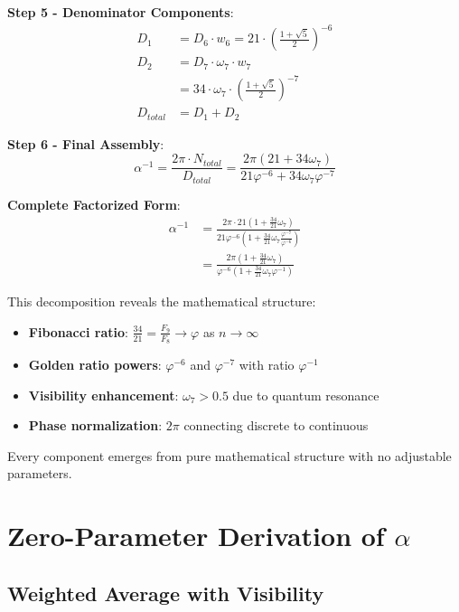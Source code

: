 \documentclass[%
 reprint,
 amsmath,amssymb,
 aps,
 prd,
 10pt,
 nofootinbib,      %
 longbibliography  %
]{revtex4-2}
\theoremstyle{definition}
\theoremstyle{remark}
\begin{document}
\textbf{Step 5 - Denominator Components}:
\begin{align}
D_1 &= D_6 \cdot w_6 = 21 \cdot \left(\frac{1+\sqrt{5}}{2}\right)^{-6} \\
D_2 &= D_7 \cdot \omega_7 \cdot w_7 \\
&= 34 \cdot \omega_7 \cdot \left(\frac{1+\sqrt{5}}{2}\right)^{-7} \\
D_{total} &= D_1 + D_2
\end{align}

\textbf{Step 6 - Final Assembly}:
\begin{equation}
\boxed{
\alpha^{-1} = \frac{2\pi \cdot N_{total}}{D_{total}} = \frac{2\pi(21 + 34 \omega_7)}{21 \varphi^{-6} + 34 \omega_7 \varphi^{-7}}
}
\end{equation}

\textbf{Complete Factorized Form}:
\begin{align}
\alpha^{-1} &= \frac{2\pi \cdot 21(1 + \frac{34}{21}\omega_7)}{21 \varphi^{-6}(1 + \frac{34}{21}\omega_7 \frac{\varphi^{-7}}{\varphi^{-6}})} \\
&= \frac{2\pi(1 + \frac{34}{21}\omega_7)}{\varphi^{-6}(1 + \frac{34}{21}\omega_7 \varphi^{-1})}
\end{align}

This decomposition reveals the mathematical structure:
\begin{itemize}
\item \textbf{Fibonacci ratio}: $\frac{34}{21} = \frac{F_9}{F_8} \to \varphi$ as $n \to \infty$
\item \textbf{Golden ratio powers}: $\varphi^{-6}$ and $\varphi^{-7}$ with ratio $\varphi^{-1}$
\item \textbf{Visibility enhancement}: $\omega_7 > 0.5$ due to quantum resonance
\item \textbf{Phase normalization}: $2\pi$ connecting discrete to continuous
\end{itemize}

Every component emerges from pure mathematical structure with no adjustable parameters.

\section{Zero-Parameter Derivation of \texorpdfstring{$\alpha$}{alpha}}
\label{sec:derivation}

\subsection{Weighted Average with Visibility}
\end{document}
